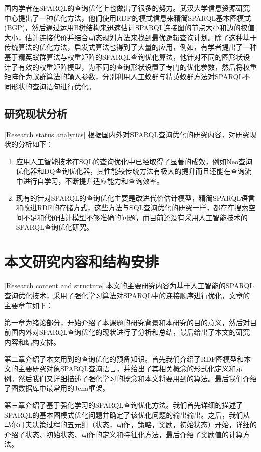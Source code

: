 国内学者在SPARQL的查询优化上也做出了很多的努力。武汉大学信息资源研究中心提出了一种优化方法\cite{XuLei}，他们使用RDF的模式信息来精简SPARQL基本图模式(BGP)，然后通过运用B树结构来迅速估计SPARQL连接图的节点大小和边的权值大小，估计连接代价并结合动态规划方法来找到最优逻辑查询计划。除了这种基于传统算法的优化方法，启发式算法也得到了大量的应用，例如，有学者提出了一种基于精英蚁群算法与权重矩阵的SPARQL查询优化算法\cite{精英蚁群}，他针对不同的图形状设计了有效的权重矩阵模型，为不同的查询形状设置了专门的优化参数，然后将权重矩阵作为蚁群算法的输入参数，分别利用人工蚁群与精英蚁群方法对SPARQL不同形状的查询语句进行优化。

\subsection{研究现状分析}[Research status analytics]
根据国内外对SPARQL查询优化的研究内容，对研究现状的分析如下：
\begin{enumerate}
    \item 应用人工智能技术在SQL的查询优化中已经取得了显著的成效，例如Neo查询优化器和DQ查询优化器，其性能较传统方法有极大的提升而且还能在查询流中进行自学习，不断提升适应能力和查询效率。
    \item 现有的针对SPARQL的查询优化主要是改进代价估计模型，精简SPARQL语言和改进RDF的存储方式，这些方法与SQL查询优化的研究一样，都存在搜索空间不足和代价估计模型不够准确的问题，而目前还没有采用人工智能技术的SPARQL查询优化研究。
\end{enumerate}


\section{本文研究内容和结构安排}[Research content and structure]
本文的主要研究内容为基于人工智能的SPARQL查询优化技术，采用了强化学习算法对SPARQL中的连接顺序进行优化，文章的主要章节如下：

第一章为绪论部分，开始介绍了本课题的研究背景和本研究的目的意义，然后对目前国内外对SPARQL查询优化的现状进行了分析和总结，最后给出了本文的研究内容和结构安排。

第二章介绍了本文用到的查询优化的预备知识。首先我们介绍了RDF图模型和本文的主要研究对象SPARQL查询语言，并给出了其相关概念的形式化定义和示例。然后我们又详细描述了强化学习的概念和本文将要用到的算法。最后我们介绍了图数据库中最常用的Jena框架。

第三章介绍了基于强化学习的SPARQL查询优化方法。我们首先详细的描述了SPARQL的基本图模式优化问题并确定了该优化问题的输出输出。之后，我们从马尔可夫决策过程的五元组（状态，动作，策略，奖励，初始状态）开始，详细的介绍了状态、初始状态、动作的定义和特征化方法，最后介绍了奖励值的计算方法。

